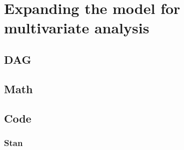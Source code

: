 \chapter{Expanding the model for multivariate analysis} \label{Expanding}

\section{DAG}\label{DAG}
\section{Math}\label{Math}
\section{Code}\label{Code}
\subsection{Stan}\label{codeInStan}
